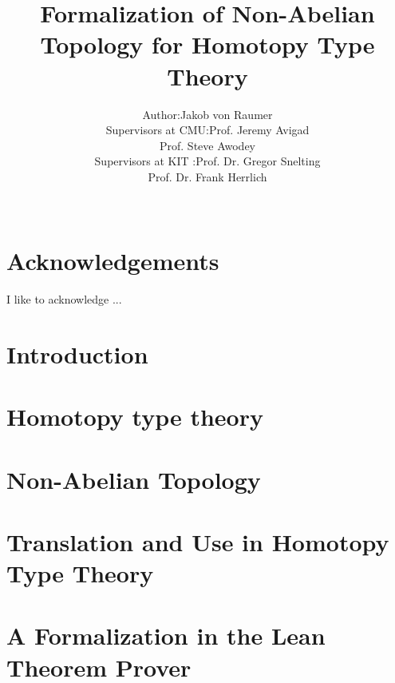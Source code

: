 \documentclass[12pt,openany]{book}
\theoremstyle{definition}
\begin{document}
\title{Formalization of Non-Abelian Topology for Homotopy Type Theory}
\author{\begin{tabular}{r@{ }l} 
Author:      & Jakob von Raumer \\[1ex] 
Supervisors at CMU: & Prof. Jeremy Avigad\\
             & Prof. Steve Awodey \\[1ex]
Supervisors at KIT : & Prof. Dr. Gregor Snelting\\
			& Prof. Dr. Frank Herrlich
\end{tabular}\\
}


\maketitle

\chapter*{Acknowledgements}
\thispagestyle{empty}

I like to acknowledge ...

\clearpage

\tableofcontents

\chapter{Introduction}



\chapter{Homotopy type theory}



\chapter{Non-Abelian Topology}

 

\chapter{Translation and Use in Homotopy Type Theory}



\chapter{A Formalization in the Lean Theorem Prover}
\end{document}
